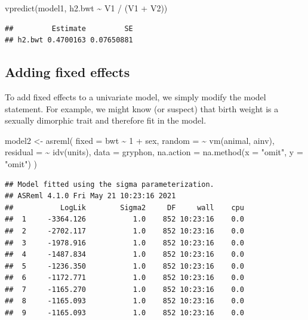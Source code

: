 \documentclass[
  12pt,
]{book}
\newenvironment{Shaded}{\begin{snugshade}}{\end{snugshade}}
\newcommand{\AttributeTok}[1]{\textcolor[rgb]{0.77,0.63,0.00}{#1}}
\newcommand{\DecValTok}[1]{\textcolor[rgb]{0.00,0.00,0.81}{#1}}
\newcommand{\FunctionTok}[1]{\textcolor[rgb]{0.00,0.00,0.00}{#1}}
\newcommand{\NormalTok}[1]{#1}
\newcommand{\OtherTok}[1]{\textcolor[rgb]{0.56,0.35,0.01}{#1}}
\newcommand{\SpecialCharTok}[1]{\textcolor[rgb]{0.00,0.00,0.00}{#1}}
\newcommand{\StringTok}[1]{\textcolor[rgb]{0.31,0.60,0.02}{#1}}
\begin{document}
\begin{Shaded}
\begin{Highlighting}[]
\FunctionTok{vpredict}\NormalTok{(model1, h2.bwt }\SpecialCharTok{\textasciitilde{}}\NormalTok{ V1 }\SpecialCharTok{/}\NormalTok{ (V1 }\SpecialCharTok{+}\NormalTok{ V2))}
\end{Highlighting}
\end{Shaded}

\begin{verbatim}
##         Estimate         SE
## h2.bwt 0.4700163 0.07650881
\end{verbatim}

\hypertarget{adding-fixed-effects}{%
\subsection{Adding fixed effects}\label{adding-fixed-effects}}

To add fixed effects to a univariate model, we simply modify the model statement. For example, we might know (or suspect) that birth weight is a sexually dimorphic trait and therefore fit in the model.

\begin{Shaded}
\begin{Highlighting}[]
\NormalTok{model2 }\OtherTok{\textless{}{-}} \FunctionTok{asreml}\NormalTok{(}
  \AttributeTok{fixed =}\NormalTok{ bwt }\SpecialCharTok{\textasciitilde{}} \DecValTok{1} \SpecialCharTok{+}\NormalTok{ sex,}
  \AttributeTok{random =} \SpecialCharTok{\textasciitilde{}} \FunctionTok{vm}\NormalTok{(animal, ainv),}
  \AttributeTok{residual =} \SpecialCharTok{\textasciitilde{}} \FunctionTok{idv}\NormalTok{(units),}
  \AttributeTok{data =}\NormalTok{ gryphon,}
  \AttributeTok{na.action =} \FunctionTok{na.method}\NormalTok{(}\AttributeTok{x =} \StringTok{"omit"}\NormalTok{, }\AttributeTok{y =} \StringTok{"omit"}\NormalTok{)}
\NormalTok{)}
\end{Highlighting}
\end{Shaded}

\begin{verbatim}
## Model fitted using the sigma parameterization.
## ASReml 4.1.0 Fri May 21 10:23:16 2021
##           LogLik        Sigma2     DF     wall    cpu
##  1     -3364.126           1.0    852 10:23:16    0.0
##  2     -2702.117           1.0    852 10:23:16    0.0
##  3     -1978.916           1.0    852 10:23:16    0.0
##  4     -1487.834           1.0    852 10:23:16    0.0
##  5     -1236.350           1.0    852 10:23:16    0.0
##  6     -1172.771           1.0    852 10:23:16    0.0
##  7     -1165.270           1.0    852 10:23:16    0.0
##  8     -1165.093           1.0    852 10:23:16    0.0
##  9     -1165.093           1.0    852 10:23:16    0.0
\end{verbatim}
\end{document}
